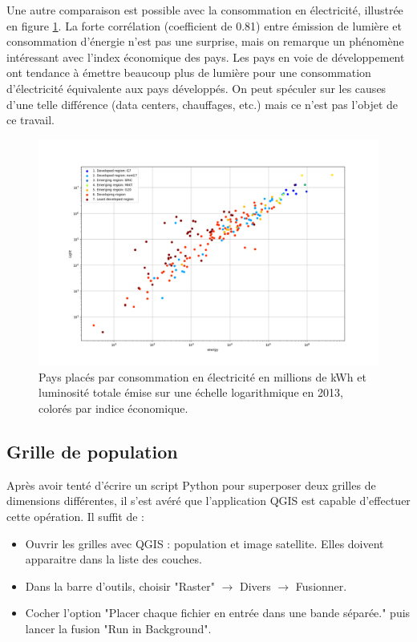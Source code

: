\documentclass[a4paper, 11pt]{report}
\begin{document}
Une autre comparaison est possible avec la consommation en électricité, illustrée en figure \ref{country_energypop_scatter}. La forte corrélation (coefficient de 0.81) entre émission de lumière et consommation d'énergie n'est pas une surprise, mais on remarque un phénomène intéressant avec l'index économique des pays. Les pays en voie de développement ont tendance à émettre beaucoup plus de lumière pour une consommation d'électricité équivalente aux pays développés. On peut spéculer sur les causes d'une telle différence (data centers, chauffages, etc.) mais ce n'est pas l'objet de ce travail.

\begin{figure}
	\centering
	\includegraphics[width=1.0\textwidth]{img/energy-light.png}
	\caption{Pays placés par consommation en électricité en millions de kWh et luminosité totale émise sur une échelle logarithmique en 2013, colorés par indice économique.}
	\label{country_energypop_scatter}
\end{figure}

\subsection{Grille de population}

Après avoir tenté d'écrire un script Python pour superposer deux grilles de dimensions différentes, il s'est avéré que l'application QGIS est capable d'effectuer cette opération. Il suffit de :

\begin{itemize}
	\item Ouvrir les grilles avec QGIS : population et image satellite. Elles doivent apparaitre dans la liste des couches.
	\item Dans la barre d'outils, choisir "Raster" $\rightarrow$ Divers $\rightarrow$ Fusionner.
	\item Cocher l'option "Placer chaque fichier en entrée dans une bande séparée." puis lancer la fusion "Run in Background".
\end{itemize}
\end{document}
